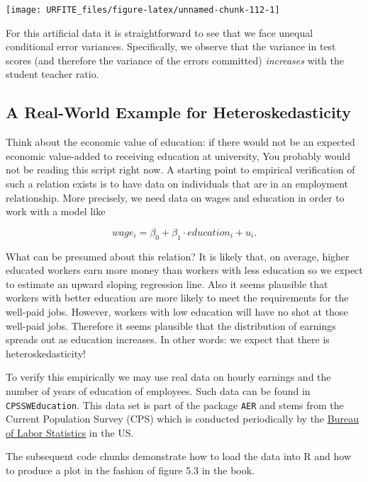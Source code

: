 \documentclass[]{book}
\theoremstyle{definition}
\theoremstyle{definition}
\theoremstyle{definition}
\theoremstyle{remark}
\begin{document}
\begin{center}\texttt{[image: URFITE\_files/figure-latex/unnamed-chunk-112-1]} \end{center}

For this artificial data it is straightforward to see that we face
unequal conditional error variances. Specifically, we observe that the
variance in test scores (and therefore the variance of the errors
committed) \emph{increases} with the student teacher ratio.

\subsection*{A Real-World Example for
Heteroskedasticity}\label{a-real-world-example-for-heteroskedasticity}

Think about the economic value of education: if there would not be an
expected economic value-added to receiving education at university, You
probably would not be reading this script right now. A starting point to
empirical verification of such a relation exists is to have data on
individuals that are in an employment relationship. More precisely, we
need data on wages and education in order to work with a model like

\[ wage_i = \beta_0 + \beta_1 \cdot education_i + u_i. \]

What can be presumed about this relation? It is likely that, on average,
higher educated workers earn more money than workers with less education
so we expect to estimate an upward sloping regression line. Also it
seems plausible that workers with better education are more likely to
meet the requirements for the well-paid jobs. However, workers with low
education will have no shot at those well-paid jobs. Therefore it seems
plausible that the distribution of earnings spreads out as education
increases. In other words: we expect that there is heteroskedasticity!

To verify this empirically we may use real data on hourly earnings and
the number of years of education of employees. Such data can be found in
\texttt{CPSSWEducation}. This data set is part of the package
\texttt{AER} and stems from the Current Population Survey (CPS) which is
conducted periodically by the \href{http://www.bls.gov/}{Bureau of Labor
Statistics} in the US.

The subsequent code chunks demonstrate how to load the data into R and
how to produce a plot in the fashion of figure 5.3 in the book.
\end{document}
